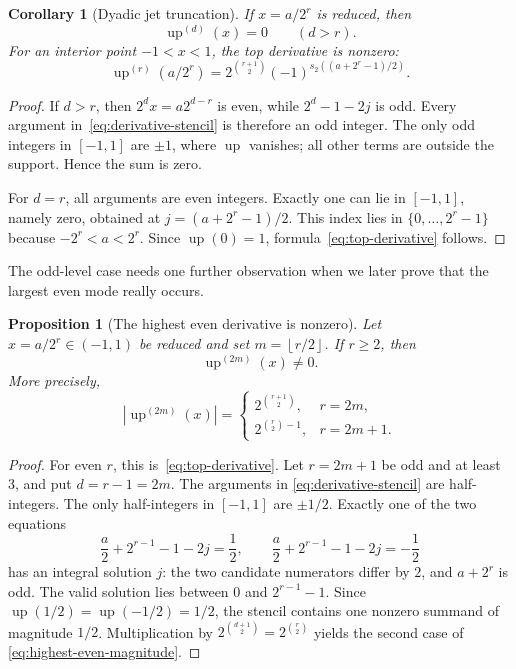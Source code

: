 \documentclass[11pt,a4paper]{article}
\newtheorem{proposition}[theorem]{Proposition}
\newtheorem{corollary}[theorem]{Corollary}
\theoremstyle{remark}
\newcommand{\up}{\operatorname{up}}
\newcommand{\floor}[1]{\left\lfloor #1\right\rfloor}
\newcommand{\abs}[1]{\left|#1\right|}
\begin{document}
\begin{corollary}[Dyadic jet truncation]
\label{cor:jet-truncation}
If $x=a/2^r$ is reduced, then
\begin{equation}
 \up^{(d)}(x)=0\qquad(d>r).
 \label{eq:dyadic-derivative-zero}
\end{equation}
For an interior point $-1<x<1$, the top derivative is nonzero:
\begin{equation}
 \up^{(r)}(a/2^r)
 =2^{\binom{r+1}{2}}
 (-1)^{s_2((a+2^r-1)/2)}.
 \label{eq:top-derivative}
\end{equation}
\end{corollary}

\begin{proof}
If $d>r$, then $2^dx=a2^{d-r}$ is even, while
$2^d-1-2j$ is odd.  Every argument in~\eqref{eq:derivative-stencil} is
therefore an odd integer.  The only odd integers in $[-1,1]$ are $\pm1$,
where $\up$ vanishes; all other terms are outside the support.  Hence the sum
is zero.

For $d=r$, all arguments are even integers.  Exactly one can lie in
$[-1,1]$, namely zero, obtained at
$j=(a+2^r-1)/2$.  This index lies in $\{0,\ldots,2^r-1\}$ because
$-2^r<a<2^r$.  Since $\up(0)=1$, formula~\eqref{eq:top-derivative} follows.
\end{proof}

The odd-level case needs one further observation when we later prove that the
largest even mode really occurs.

\begin{proposition}[The highest even derivative is nonzero]
\label{prop:highest-even-derivative}
Let $x=a/2^r\in(-1,1)$ be reduced and set $m=\floor{r/2}$.
If $r\ge2$, then
\begin{equation}
 \up^{(2m)}(x)\ne0.
 \label{eq:highest-even-nonzero}
\end{equation}
More precisely,
\begin{equation}
 \abs{\up^{(2m)}(x)}=
 \begin{cases}
  2^{\binom{r+1}{2}},&r=2m,\\[0.3em]
  2^{\binom{r}{2}-1},&r=2m+1.
 \end{cases}
 \label{eq:highest-even-magnitude}
\end{equation}
\end{proposition}

\begin{proof}
For even $r$, this is~\eqref{eq:top-derivative}.  Let $r=2m+1$ be odd
and at least $3$, and put $d=r-1=2m$.  The arguments in
\eqref{eq:derivative-stencil} are half-integers.  The only half-integers in
$[-1,1]$ are $\pm1/2$.  Exactly one of the two equations
\[
 \frac a2+2^{r-1}-1-2j=\frac12,
 \qquad
 \frac a2+2^{r-1}-1-2j=-\frac12
\]
has an integral solution $j$: the two candidate numerators differ by $2$, and
$a+2^r$ is odd.  The valid solution lies between $0$ and $2^{r-1}-1$.
Since $\up(1/2)=\up(-1/2)=1/2$, the stencil contains one nonzero summand of
magnitude $1/2$.  Multiplication by
$2^{\binom{d+1}{2}}=2^{\binom r2}$ yields the second case of
\eqref{eq:highest-even-magnitude}.
\end{proof}
\end{document}
